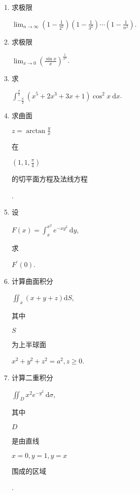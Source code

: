 \documentclass[10pt]{article}
\begin{document}
\begin{enumerate}
  \item \begin{CJK}{UTF8}{mj}求极限\end{CJK} $\lim _{n \rightarrow \infty}\left(1-\frac{1}{2^{2}}\right)\left(1-\frac{1}{3^{2}}\right) \cdots\left(1-\frac{1}{n^{2}}\right)$.

  \item \begin{CJK}{UTF8}{mj}求极限\end{CJK} $\lim _{x \rightarrow 0}\left(\frac{\sin x}{x}\right)^{\frac{1}{x^{2}}}$.

  \item \begin{CJK}{UTF8}{mj}求\end{CJK} $\int_{-\frac{\pi}{2}}^{\frac{\pi}{2}}\left(x^{5}+2 x^{3}+3 x+1\right) \cos ^{2} x \mathrm{~d} x$.

  \item \begin{CJK}{UTF8}{mj}求曲面\end{CJK} $z=\arctan \frac{y}{x}$ \begin{CJK}{UTF8}{mj}在\end{CJK} $\left(1,1, \frac{\pi}{4}\right)$ \begin{CJK}{UTF8}{mj}的切平面方程及法线方程\end{CJK}.

  \item \begin{CJK}{UTF8}{mj}设\end{CJK} $F(x)=\int_{x}^{x^{2}} e^{-x y^{2}} \mathrm{~d} y$, \begin{CJK}{UTF8}{mj}求\end{CJK} $F^{\prime}(0)$.

  \item \begin{CJK}{UTF8}{mj}计算曲面积分\end{CJK} $\iint_{x}(x+y+z) \mathrm{d} S$, \begin{CJK}{UTF8}{mj}其中\end{CJK} $S$ \begin{CJK}{UTF8}{mj}为上半球面\end{CJK} $x^{2}+y^{2}+z^{2}=a^{2}, z \geqslant 0$.

  \item \begin{CJK}{UTF8}{mj}计算二重积分\end{CJK} $\iint_{D} x^{2} e^{-y^{2}} \mathrm{~d} \sigma$, \begin{CJK}{UTF8}{mj}其中\end{CJK} $D$ \begin{CJK}{UTF8}{mj}是由直线\end{CJK} $x=0, y=1, y=x$ \begin{CJK}{UTF8}{mj}围成的区域\end{CJK}.

\end{enumerate}
\end{document}
